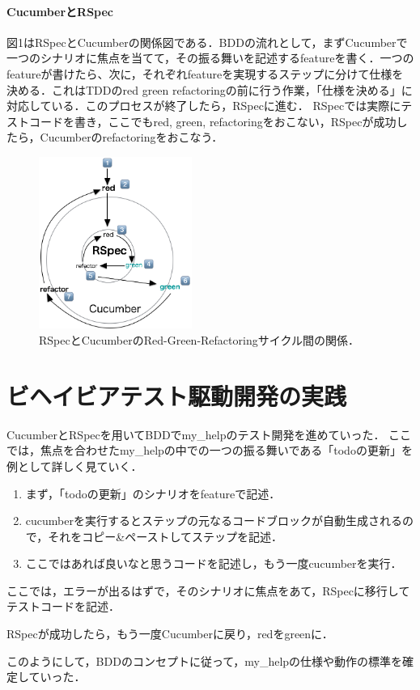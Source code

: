 \documentclass[10pt,a4j,twocolumn]{jsarticle}
\begin{document}
\paragraph{CucumberとRSpec}
図1はRSpecとCucumberの関係図である．BDDの流れとして，まずCucumberで一つのシナリオに焦点を当てて，その振る舞いを記述するfeatureを書く．一つのfeatureが書けたら、次に，それぞれfeatureを実現するステップに分けて仕様を決める．これはTDDのred green refactoringの前に行う作業，「仕様を決める」に対応している．このプロセスが終了したら，RSpecに進む．
RSpecでは実際にテストコードを書き，ここでもred, green, refactoringをおこない，RSpecが成功したら，Cucumberのrefactoringをおこなう．
\begin{figure}
\begin{center}
\includegraphics[width=5cm, bb=0 0 394 443]{abst_fig.png}
\caption{RSpecとCucumberのRed-Green-Refactoringサイクル間の関係．}
\end{center}
\vspace{-3em}
\end{figure}

\section{ビヘイビアテスト駆動開発の実践}
CucumberとRSpecを用いてBDDでmy\_helpのテスト開発を進めていった．
ここでは，焦点を合わせたmy\_helpの中での一つの振る舞いである「todoの更新」を例として詳しく見ていく．
\begin{description}
\item[cucumber]
\begin{enumerate}
\item まず，「todoの更新」のシナリオをfeatureで記述．
\item cucumberを実行するとステップの元なるコードブロックが自動生成されるので，それをコピー\&ペーストしてステップを記述．
\item ここではあれば良いなと思うコードを記述し，もう一度cucumberを実行．
\end{enumerate}
\item[rspec]
\item ここでは，エラーが出るはずで，そのシナリオに焦点をあて，RSpecに移行してテストコードを記述．
\item[cucumber] RSpecが成功したら，もう一度Cucumberに戻り，redをgreenに．
\end{description}
このようにして，BDDのコンセプトに従って，my\_helpの仕様や動作の標準を確定していった．
\end{document}
